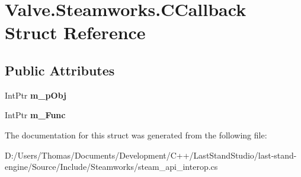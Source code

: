 \hypertarget{structValve_1_1Steamworks_1_1CCallback}{}\section{Valve.\+Steamworks.\+C\+Callback Struct Reference}
\label{structValve_1_1Steamworks_1_1CCallback}
\subsection*{Public Attributes}
\begin{DoxyCompactItemize}
\item 
\hypertarget{structValve_1_1Steamworks_1_1CCallback_af42bf956248b920e4d922fd31bd16691}{}Int\+Ptr {\bfseries m\+\_\+p\+Obj}\label{structValve_1_1Steamworks_1_1CCallback_af42bf956248b920e4d922fd31bd16691}

\item 
\hypertarget{structValve_1_1Steamworks_1_1CCallback_ab2440c05b7900684c0d5a488769445a4}{}Int\+Ptr {\bfseries m\+\_\+\+Func}\label{structValve_1_1Steamworks_1_1CCallback_ab2440c05b7900684c0d5a488769445a4}

\end{DoxyCompactItemize}


The documentation for this struct was generated from the following file\+:\begin{DoxyCompactItemize}
\item 
D\+:/\+Users/\+Thomas/\+Documents/\+Development/\+C++/\+Last\+Stand\+Studio/last-\/stand-\/engine/\+Source/\+Include/\+Steamworks/steam\+\_\+api\+\_\+interop.\+cs\end{DoxyCompactItemize}
